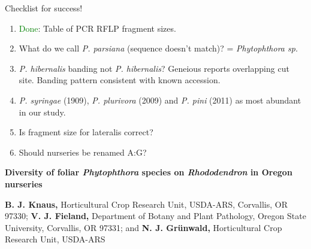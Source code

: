 \documentclass[12pt]{article}
\date{}
\begin{document}

Checklist for success!

\begin{enumerate}
  \item \textcolor{green}{Done}: Table of PCR RFLP fragment sizes.

  \item What do we call \emph{P. parsiana} (sequence doesn't match)? = \emph{Phytophthora sp.}
  \item \emph{P. hibernalis} banding not \emph{P. hibernalis}? Geneious reports overlapping cut site. Banding pattern consistent with known accession.

  \item \emph{P. syringae} (1909), \emph{P. plurivora} (2009) and \emph{P. pini} (2011) as most abundant in our study.
  \item Is fragment size for lateralis correct?
  \item Should nurseries be renamed A:G?

\end{enumerate}

\newpage


\begin{flushleft}
{\large
\textbf{Diversity of foliar \textit{Phytophthora} species on \textit{Rhododendron} in Oregon nurseries}
}
\\

\hspace{12pt}

\textbf{B. J. Knaus,} Horticultural Crop Research Unit, USDA-ARS, Corvallis, OR 97330; \textbf{V. J. Fieland,} Department of Botany and Plant Pathology, Oregon State University, Corvallis, OR 97331; and \textbf{N. J. Gr\"{u}nwald,} Horticultural Crop Research Unit, USDA-ARS\\

\end{flushleft}

\end{document}
